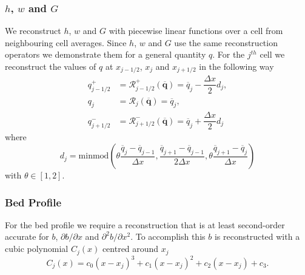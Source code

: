 \documentclass[times]{elsarticle}
\newcommand{\vecn}[1]{\boldsymbol{#1}}
\begin{document}
\subsubsection{$h$, $w$ and $G$ }
We reconstruct $h$, $w$ and $G$ with piecewise linear functions over a cell from neighbouring cell averages. Since $h$, $w$ and $G$ use the same reconstruction operators we demonstrate them for a general quantity $q$. For the $j^{th}$ cell we reconstruct the values of $q$ at $x_{j-1/2} $, $x_{j} $ and $x_{j+1/2}$ in the following way
\begin{subequations}
	\begin{align}
	q^+_{j-1/2} & = \mathcal{R}^+_{j-1/2} \left(\overline{\vecn{q}}\right) = \overline{q}_j - \dfrac{\Delta x}{2} d_j, \\
	q_{j} &= \mathcal{R}_{j} \left(\overline{\vecn{q}}\right) =\overline{q}_j ,\\
	q^-_{j+1/2} &= \mathcal{R}^-_{j+1/2} \left(\overline{\vecn{q}}\right) = \overline{q}_j + \dfrac{\Delta x}{2} d_j
	\end{align}
	\label{eqn:ReconforhwG}
\end{subequations}
where 
\begin{equation}
d_j = \text{minmod}\left(\theta \dfrac{\overline{q}_j -\overline{q}_{j-1} }{\Delta x}, \dfrac{\overline{q}_{j+1} -\overline{q}_{j-1} }{2\Delta x}, \theta\dfrac{\overline{q}_{j+1} -\overline{q}_{j} }{\Delta x}\right)
\label{eqn:slopehGrecon}
\end{equation}
with $\theta \in \left[1,2\right]$.

\subsubsection{Bed Profile}
For the bed profile we require a reconstruction that is at least second-order accurate for $b$, $\partial b / \partial x$ and $\partial^2 b / \partial x^2$. To accomplish this $b$ is reconstructed with a cubic polynomial $C_j(x)$ centred around $x_j$
\begin{equation*}
C_j(x) = c_0 \left(x - x_j\right)^3 + c_1 \left(x - x_j\right)^2 + c_2 \left(x - x_j\right) + c_3.
\label{eqn:cubicforbedrecon}
\end{equation*}
\end{document}
